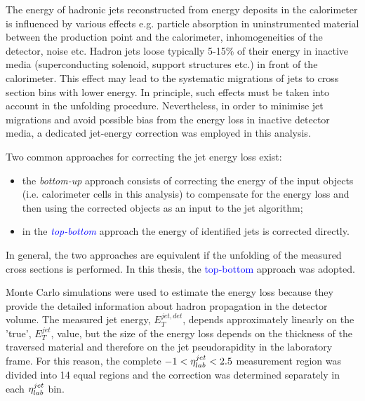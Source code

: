 The energy of hadronic jets reconstructed from energy deposits in the calorimeter is influenced by various effects e.g. particle absorption in uninstrumented material between the production point and the calorimeter, inhomogeneities of the detector, noise etc. Hadron jets loose typically 5-15\% of their energy in inactive media (superconducting solenoid, support structures etc.) in front of the calorimeter. This effect may lead to the systematic migrations of jets to cross section bins with lower energy. In principle, such effects must be taken into account in the unfolding procedure. Nevertheless, in order to minimise jet migrations and avoid possible bias from the energy loss in inactive detector media, a dedicated jet-energy correction was employed in this analysis.

Two common approaches for correcting the jet energy loss exist:
\begin{itemize}
 \item the \emph{bottom-up} approach consists of correcting the energy of the input objects (i.e. calorimeter cells in this analysis) to compensate for the energy loss and then using the corrected objects as an input to the jet algorithm;
 \item in the \textcolor{blue}{\emph{top-bottom}} approach the energy of identified jets is corrected directly.
\end{itemize}
In general, the two approaches are equivalent if the unfolding of the measured cross sections is performed. In this thesis, the \textcolor{blue}{top-bottom} approach was adopted.

Monte Carlo simulations were used to estimate the energy loss because they provide the detailed information about hadron propagation in the detector volume. The measured jet energy, $E_T^{jet,det}$, depends approximately linearly on the 'true', $E_T^{jet}$, value, but the size of the energy loss depends on the thickness of the traversed material and therefore on the jet pseudorapidity in the laboratory frame. For this reason, the complete $-1<\mbox{$\eta^{jet}_{lab}$}<2.5$ measurement region was divided into 14 equal regions and the correction was determined separately in each $\mbox{$\eta^{jet}_{lab}$}$ bin.

